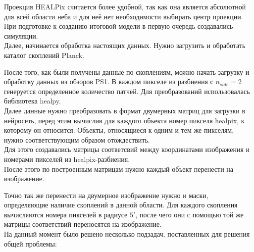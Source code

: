\documentclass{article}
\begin{document}
Проекция HEALPix считается более удобной, так как она является абсолютной для всей области неба и 
для неё нет необходимости выбирать центр проекции.\\

При подготовке к созданию итоговой модели в первую очередь создавались симуляции. \\


Далее, начинается обработка настоящих данных. Нужно загрузить и обработать каталог скоплений Planck. 


После того, как были получены данные по скоплениям, можно начать загрузку и обработку данных из 
обзоров PS1. В каждом пикселе из разбиения с $n_{side}=2$ генеруется определенное количество патчей. 
Для преобразований использовалась библиотека healpy.\\

Далее данные нужно преобразовать в формат двумерных матриц для загрузки в нейросеть, перед этим 
вычислив для каждого объекта номер пикселя healpix, к которому он относится. Объекты, относящиеся 
к одним и тем же пикселям, нужно соответствующим образом отождествить.\\

Для этого создавались матрицы соответсвий между координатами изображения и номерами пикселей из 
healpix-разбиения.\\

После этого по построенным матрицам нужно каждый объект перенести на изображение.

Точно так же перенести на двумерное изображение нужно и маски, определяющие наличие скоплений в 
данной области. Для каждого скопления вычисляются номера пикселей в радиусе $5'$, после чего они с 
помощью той же матрицы соответствий переносятся на изображение.\\

На данный момент было решено несколько подзадач, поставленных для решения общей проблемы:
\end{document}
